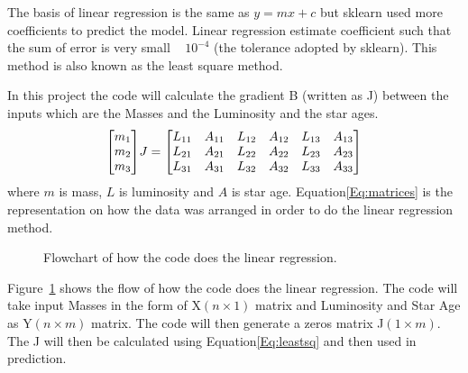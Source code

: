 The basis of linear regression is the same as $y= mx+c$ but sklearn used more coefficients to predict the model. Linear regression estimate  coefficient such that the sum of error is very small ~  $10^{-4}$ (the tolerance adopted by sklearn). This method is also known as the least square method.

In this project the code will calculate the gradient B (written as J)  between the inputs which are the Masses and the Luminosity and the star ages.
\begin{equation}
    \mqty[
        m_{1}\\m_{2}\\m_{3}  
    ]
    J
    =
    \mqty[
        L_{11}&A_{11}&L_{12}&A_{12}&L_{13}&A_{13}\\
        L_{21}&A_{21}&L_{22}&A_{22}&L_{23}&A_{23}\\
        L_{31}&A_{31}&L_{32}&A_{32}&L_{33}&A_{33}
    ]
    \label{Eq:matrices}
\end{equation}
where $m$ is mass, $L$ is luminosity and $A$ is star age.
Equation\ref{Eq:matrices} is the representation on how the data was arranged in order to do the linear regression method. 

\begin{figure}[H]
    \centering

    \caption{Flowchart of how the code does the linear regression.}
    \label{fig:flow}
\end{figure}

Figure~\ref{fig:flow} shows the flow of how the code does the linear regression. The code will take input Masses in the form of X$(n\times1)$ matrix and Luminosity and Star Age as Y$(n\times m)$ matrix. The code will then generate a zeros matrix J$(1\times m)$. The J will then be calculated using Equation\ref{Eq:leastsq} and then used in prediction.

